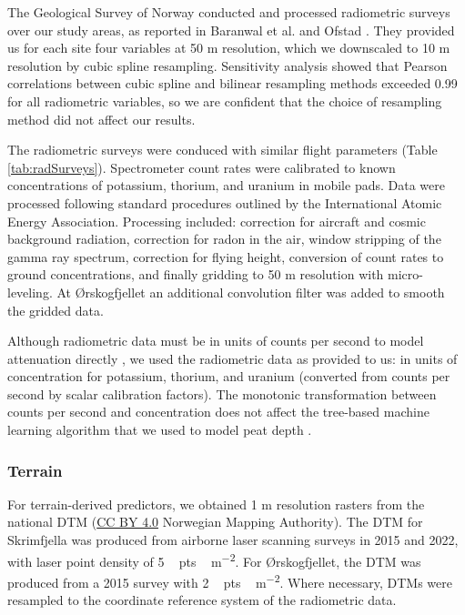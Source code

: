 \documentclass[soil, manuscript]{copernicus}
\begin{document}
The Geological Survey of Norway conducted and processed radiometric surveys over our study areas, as reported in Baranwal et al. \citeyearpar{baranwalHelicopterborneMagneticElectromagnetic2013} and Ofstad \citeyearpar{ofstadHelicopterborneMagneticRadiometric2015}.
They provided us for each site four variables at 50 m resolution, which we downscaled to 10 m resolution by cubic spline resampling.
Sensitivity analysis showed that Pearson correlations between cubic spline and bilinear resampling methods exceeded 0.99 for all radiometric variables, so we are confident that the choice of resampling method did not affect our results.

The radiometric surveys were conduced with similar flight parameters (Table \ref{tab:radSurveys}).
Spectrometer count rates were calibrated to known concentrations of potassium, thorium, and uranium in mobile pads.
Data were processed following standard procedures outlined by the International Atomic Energy Association.
Processing included: correction for aircraft and cosmic background radiation, correction for radon in the air, window stripping of the gamma ray spectrum, correction for flying height, conversion of count rates to ground concentrations, and finally gridding to 50 m resolution with micro-leveling.
At Ørskogfjellet an additional convolution filter was added to smooth the gridded data.

Although radiometric data must be in units of counts per second to model attenuation directly \citep{olearyDigitalSoilMapping2022}, we used the radiometric data as provided to us: in units of concentration for potassium, thorium, and uranium (converted from counts per second by scalar calibration factors).
The monotonic transformation between counts per second and concentration does not affect the tree-based machine learning algorithm that we used to model peat depth \citep{hastieElementsStatisticalLearning2009}.

\subsubsection{Terrain}

For terrain-derived predictors, we obtained 1 m resolution rasters from the national DTM (\href{https://creativecommons.org/licenses/by/4.0/}{CC BY 4.0} Norwegian Mapping Authority).
The DTM for Skrimfjella was produced from airborne laser scanning surveys in 2015 and 2022, with laser point density of \unit{5\,pts\,m^{-2}}.
For Ørskogfjellet, the DTM was produced from a 2015 survey with \unit{2\,pts\,m^{-2}}.
Where necessary, DTMs were resampled to the coordinate reference system of the radiometric data.
\end{document}
